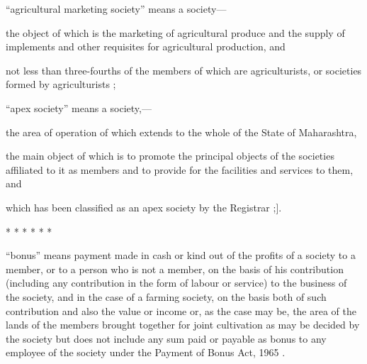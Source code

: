 \documentclass[reprint]{mhact}
\begin{document}
      \begin{subsectionlist}
         ``agricultural marketing society'' means a
        society---

        \begin{clause}

         the object of which is the marketing of
        agricultural produce and the supply of implements and other
        requisites for agricultural production, and

         not less than
        three-fourths of the members of which are agriculturists, or
        societies formed by agriculturists ;
      \end{clause}
      
        ``apex society'' means a society,---
      \begin{clause}
         the area of operation of which extends
        to the whole of the State of Maharashtra,

         the main object of which is to promote the
        principal objects of the societies affiliated to it as members
        and to provide for the facilities and services to them, and

         which has been classified as an
        apex society by the Registrar ;].
      \end{clause}
      

       *  * * * * *

       ``bonus'' means payment made in cash or kind out of
      the profits of a society to a member, or to a person who is not
      a member, on the basis of his contribution (including any
      contribution in the form of labour or service) to the business
      of the society, and in the case of a farming society, on the
      basis both of such contribution and also the value or income or,
      as the case may be, the area of the lands of the members brought
      together for joint cultivation as may be decided by the society
      but does not include any sum paid or payable as bonus to any
      employee of the society under the Payment of Bonus Act,
      1965%
      .
    \end{subsectionlist} 
\end{document}
